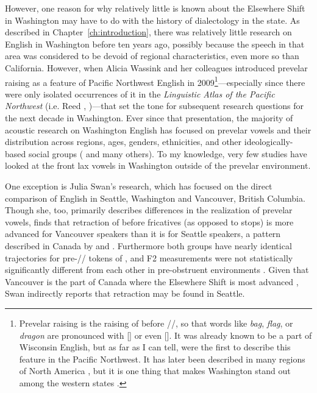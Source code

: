 However, one reason for why relatively little is known about the Elsewhere Shift in Washington may have to do with the history of dialectology in the state. As described in Chapter~\ref{ch:introduction}, there was relatively little research on English in Washington before ten years ago, possibly because the speech in that area was considered to be devoid of regional characteristics, even more so than California. However, when Alicia Wassink and her colleagues introduced prevelar raising as a feature of Pacific Northwest English in 2009\footnote{Prevelar raising is the raising of \trap before //, so that words like \textit{bag}, \textit{flag}, or \textit{dragon} are pronounced with [] or even []. It was already known to be a part of Wisconsin English, but as far as I can tell, \citet{wassink_etal_2009} were the first to describe this feature in the Pacific Northwest. It has later been described in many regions of North America \citep{stanley_2019_BEG_paper}, but it is one thing that makes Washington stand out among the western states \citep{wassink_2016_pads}.}---especially since there were only isolated occurrences of it in the \textit{Linguistic Atlas of the Pacific Northwest} (i.e. Reed \citeyear{reed_1956}, \citeyear{reed_1961})---that set the tone for subsequent research questions for the next decade in Washington. Ever since that presentation, the majority of acoustic research on Washington English has focused on prevelar vowels and their distribution across regions, ages, genders, ethnicities, and other ideologically-based social groups (\citealt{wassink_2011, wassink_2015, wassink_2016_pads, freeman_2014, riebold_2015_diss, swan_2016_proceedings, stanley_2018_pwpl} and many others). To my knowledge, very few studies have looked at the front lax vowels in Washington outside of the prevelar environment.

One exception is Julia Swan’s research, which has focused on the direct comparison of English in Seattle, Washington and Vancouver, British Columbia. Though she, too, primarily describes differences in the realization of prevelar vowels, \citet[8]{swan_2016_proceedings} finds that retraction of \trap before fricatives (as opposed to stops) is more advanced for Vancouver speakers than it is for Seattle speakers, a pattern described in Canada by \citet[214]{clarke_etal_1995} and \citet{boberg_2019}. Furthermore both groups have nearly identical trajectories for pre-// tokens of \trap \citeyearpar[10]{swan_2016_proceedings}, and F2 measurements were not statistically significantly different from each other in pre-obstruent environments \citep{swan_2015}. Given that Vancouver is the part of Canada where the Elsewhere Shift is most advanced \citep{hall_2000, tamminga_sadlier_brown_2008, roeder_etal_2018}, Swan indirectly reports that \trap retraction may be found in Seattle.

